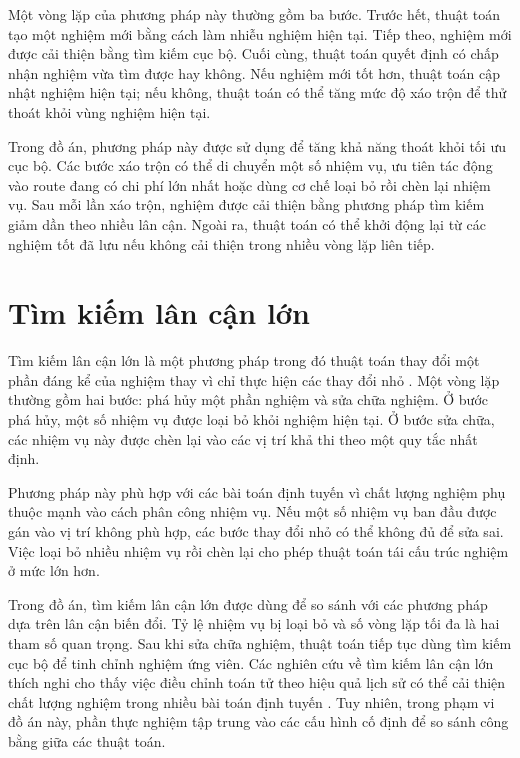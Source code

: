 Một vòng lặp của phương pháp này thường gồm ba bước. Trước hết, thuật toán tạo một nghiệm mới bằng cách làm nhiễu nghiệm hiện tại. Tiếp theo, nghiệm mới được cải thiện bằng tìm kiếm cục bộ. Cuối cùng, thuật toán quyết định có chấp nhận nghiệm vừa tìm được hay không. Nếu nghiệm mới tốt hơn, thuật toán cập nhật nghiệm hiện tại; nếu không, thuật toán có thể tăng mức độ xáo trộn để thử thoát khỏi vùng nghiệm hiện tại.

Trong đồ án, phương pháp này được sử dụng để tăng khả năng thoát khỏi tối ưu cục bộ. Các bước xáo trộn có thể di chuyển một số nhiệm vụ, ưu tiên tác động vào route đang có chi phí lớn nhất hoặc dùng cơ chế loại bỏ rồi chèn lại nhiệm vụ. Sau mỗi lần xáo trộn, nghiệm được cải thiện bằng phương pháp tìm kiếm giảm dần theo nhiều lân cận. Ngoài ra, thuật toán có thể khởi động lại từ các nghiệm tốt đã lưu nếu không cải thiện trong nhiều vòng lặp liên tiếp.

\section{Tìm kiếm lân cận lớn}

Tìm kiếm lân cận lớn là một phương pháp trong đó thuật toán thay đổi một phần đáng kể của nghiệm thay vì chỉ thực hiện các thay đổi nhỏ \cite{shaw1998lns}. Một vòng lặp thường gồm hai bước: phá hủy một phần nghiệm và sửa chữa nghiệm. Ở bước phá hủy, một số nhiệm vụ được loại bỏ khỏi nghiệm hiện tại. Ở bước sửa chữa, các nhiệm vụ này được chèn lại vào các vị trí khả thi theo một quy tắc nhất định.

Phương pháp này phù hợp với các bài toán định tuyến vì chất lượng nghiệm phụ thuộc mạnh vào cách phân công nhiệm vụ. Nếu một số nhiệm vụ ban đầu được gán vào vị trí không phù hợp, các bước thay đổi nhỏ có thể không đủ để sửa sai. Việc loại bỏ nhiều nhiệm vụ rồi chèn lại cho phép thuật toán tái cấu trúc nghiệm ở mức lớn hơn.

Trong đồ án, tìm kiếm lân cận lớn được dùng để so sánh với các phương pháp dựa trên lân cận biến đổi. Tỷ lệ nhiệm vụ bị loại bỏ và số vòng lặp tối đa là hai tham số quan trọng. Sau khi sửa chữa nghiệm, thuật toán tiếp tục dùng tìm kiếm cục bộ để tinh chỉnh nghiệm ứng viên. Các nghiên cứu về tìm kiếm lân cận lớn thích nghi cho thấy việc điều chỉnh toán tử theo hiệu quả lịch sử có thể cải thiện chất lượng nghiệm trong nhiều bài toán định tuyến \cite{ropke2006alns,pisinger2007vrp}. Tuy nhiên, trong phạm vi đồ án này, phần thực nghiệm tập trung vào các cấu hình cố định để so sánh công bằng giữa các thuật toán.


